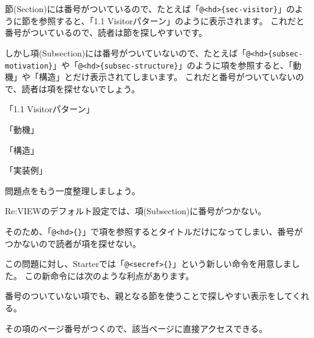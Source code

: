 \begin{starteritemize}
\item 節(Section)には番号がついているので、たとえば「\texttt{@}\texttt{\textless{}hd\textgreater{}\{sec{-}visitor\}}」のように節を参照すると、「1.1 Visitorパターン」のように表示されます。
   これだと番号がついているので、読者は節を探しやすいです。
\item しかし項(Subsection)には番号がついていないので、たとえば「\texttt{@}\texttt{\textless{}hd\textgreater{}\{subsec{-}motivation\}}」や「\texttt{@}\texttt{\textless{}hd\textgreater{}\{subsec{-}structure\}}」のように項を参照すると、「動機」や「構造」とだけ表示されてしまいます。
   これだと番号がついていないので、読者は項を探せないでしょう。
\end{starteritemize}

\begin{starterprogram}\end{starterprogram}
\noindent
{}

\starterresult

\begin{starteritemize}
\item 「1.1 Visitorパターン」
\item 「動機」
\item 「構造」
\item 「実装例」
\end{starteritemize}

\endstarterresult

問題点をもう一度整理しましょう。

\begin{starteritemize}
\item Re:VIEWのデフォルト設定では、項(Subsection)に番号がつかない。
\item そのため、「\texttt{@}\texttt{\textless{}hd\textgreater{}\{\}}」で項を参照するとタイトルだけになってしまい、番号がつかないので読者が項を探せない。
\end{starteritemize}

この問題に対し、Starterでは「\texttt{@}\texttt{\textless{}secref\textgreater{}\{\}}」という新しい命令を用意しました。
この新命令には次のような利点があります。

\begin{starteritemize}
\item 番号のついていない項でも、親となる節を使うことで探しやすい表示をしてくれる。
\item その項のページ番号がつくので、該当ページに直接アクセスできる。
\end{starteritemize}


